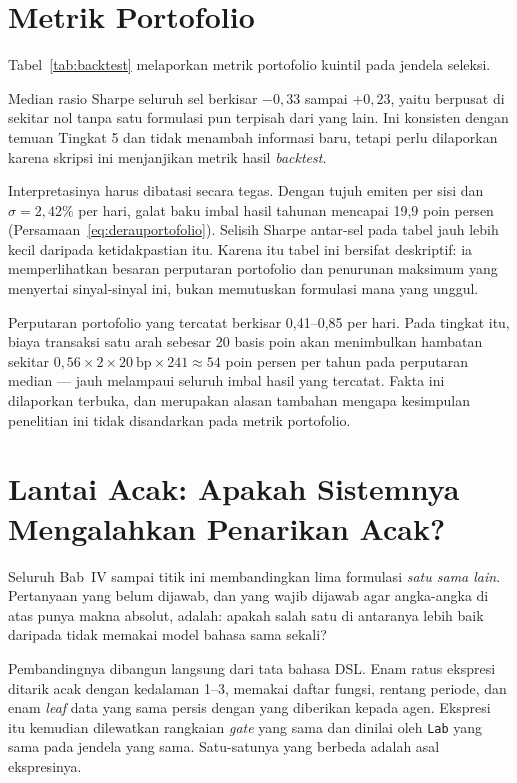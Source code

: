 \documentclass{laporanta1statugm}
\newcommand{\code}[1]{\texttt{#1}}
\begin{document}
\section{Metrik Portofolio}

Tabel~\ref{tab:backtest} melaporkan metrik portofolio kuintil pada jendela
seleksi.



Median rasio Sharpe seluruh sel berkisar $-0{,}33$ sampai $+0{,}23$, yaitu
berpusat di sekitar nol tanpa satu formulasi pun terpisah dari yang lain. Ini
konsisten dengan temuan Tingkat 5 dan tidak menambah informasi baru, tetapi
perlu dilaporkan karena skripsi ini menjanjikan metrik hasil \textit{backtest}.

Interpretasinya harus dibatasi secara tegas. Dengan tujuh emiten per sisi dan
$\sigma = 2{,}42\%$ per hari, galat baku imbal hasil tahunan mencapai 19,9 poin
persen (Persamaan~\eqref{eq:derauportofolio}). Selisih Sharpe antar-sel pada
tabel jauh lebih kecil daripada ketidakpastian itu. Karena itu tabel ini
bersifat deskriptif: ia memperlihatkan besaran perputaran portofolio dan
penurunan maksimum yang menyertai sinyal-sinyal ini, bukan memutuskan formulasi
mana yang unggul.

Perputaran portofolio yang tercatat berkisar 0,41--0,85 per hari. Pada tingkat
itu, biaya transaksi satu arah sebesar 20 basis poin akan menimbulkan hambatan
sekitar $0{,}56\times2\times20\ \text{bp}\times241 \approx 54$ poin persen per
tahun pada perputaran median --- jauh melampaui seluruh imbal hasil yang
tercatat. Fakta ini dilaporkan terbuka, dan merupakan alasan tambahan mengapa
kesimpulan penelitian ini tidak disandarkan pada metrik portofolio.

\section{Lantai Acak: Apakah Sistemnya Mengalahkan Penarikan Acak?}
\label{sec:lantai}

Seluruh Bab~IV sampai titik ini membandingkan lima formulasi \emph{satu sama
lain}. Pertanyaan yang belum dijawab, dan yang wajib dijawab agar angka-angka
di atas punya makna absolut, adalah: apakah salah satu di antaranya lebih baik
daripada tidak memakai model bahasa sama sekali?

Pembandingnya dibangun langsung dari tata bahasa DSL. Enam ratus ekspresi
ditarik acak dengan kedalaman 1--3, memakai daftar fungsi, rentang periode, dan
enam \textit{leaf} data yang sama persis dengan yang diberikan kepada agen.
Ekspresi itu kemudian dilewatkan rangkaian \textit{gate} yang sama dan dinilai
oleh \code{Lab} yang sama pada jendela yang sama. Satu-satunya yang berbeda
adalah asal ekspresinya.
\end{document}
